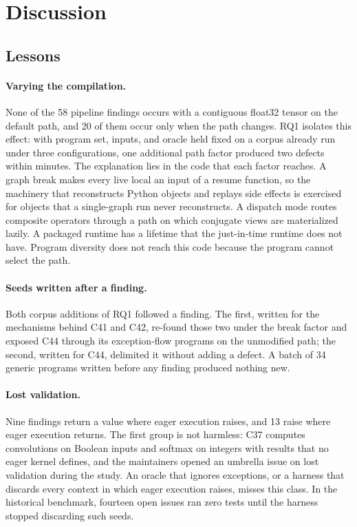 \section{Discussion}
\label{sec:discussion}

\subsection{Lessons}

\paragraph{Varying the compilation.} None of the 58 pipeline findings occurs with a contiguous
float32 tensor on the default path, and 20 of them occur only when the path changes. RQ1 isolates this
effect: with program set, inputs, and oracle held fixed on a corpus already run under three configurations, one
additional path factor produced two defects within minutes. The explanation lies in the code
that each factor reaches. A graph break makes every live local an input of a resume function, so the machinery
that reconstructs Python objects and replays side effects is exercised for objects that a single-graph run
never reconstructs. A dispatch mode routes composite operators through a path on which conjugate views are
materialized lazily. A packaged runtime has a lifetime that the just-in-time runtime does not have. Program
diversity does not reach this code because the program cannot select the path.

\paragraph{Seeds written after a finding.} Both corpus additions of RQ1 followed a finding. The first, written
for the mechanisms behind C41 and C42, re-found those two under the break factor and exposed C44 through its
exception-flow programs on the unmodified path; the second, written for C44, delimited it without adding a defect. A batch of 34 generic programs written before any finding produced nothing new.

\paragraph{Lost validation.} Nine findings return a value where eager execution raises, and 13 raise where
eager execution returns. The first group is not harmless: C37 computes convolutions on Boolean inputs and
softmax on integers with results that no eager kernel defines, and the maintainers opened an umbrella issue on
lost validation during the study. An oracle that ignores exceptions, or a harness that discards every context in
which eager execution raises, misses this class. In the historical benchmark, fourteen open issues ran
zero tests until the harness stopped discarding such seeds.

